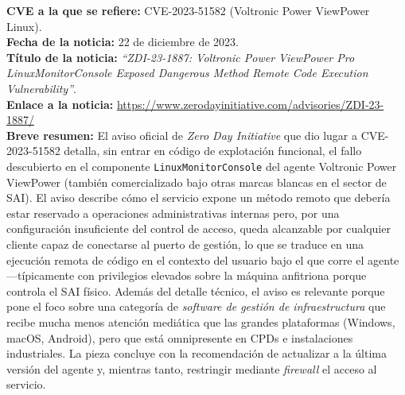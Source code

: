 \begin{tcolorbox}[breakable, colback=lightblue, colframe=darkblue, title=\textbf{Ficha de noticia 3}]
\textbf{CVE a la que se refiere:} CVE-2023-51582 (Voltronic Power ViewPower Linux).\\
\textbf{Fecha de la noticia:} 22 de diciembre de 2023.\\
\textbf{Título de la noticia:} \textit{``ZDI-23-1887: Voltronic Power ViewPower Pro LinuxMonitorConsole Exposed Dangerous Method Remote Code Execution Vulnerability''}.\\
\textbf{Enlace a la noticia:} \url{https://www.zerodayinitiative.com/advisories/ZDI-23-1887/}\\
\textbf{Breve resumen:} El aviso oficial de \textit{Zero Day Initiative} que dio lugar a CVE-2023-51582 detalla, sin entrar en código de explotación funcional, el fallo descubierto en el componente \texttt{LinuxMonitorConsole} del agente Voltronic Power ViewPower (también comercializado bajo otras marcas blancas en el sector de SAI). El aviso describe cómo el servicio expone un método remoto que debería estar reservado a operaciones administrativas internas pero, por una configuración insuficiente del control de acceso, queda alcanzable por cualquier cliente capaz de conectarse al puerto de gestión, lo que se traduce en una ejecución remota de código en el contexto del usuario bajo el que corre el agente ---típicamente con privilegios elevados sobre la máquina anfitriona porque controla el SAI físico. Además del detalle técnico, el aviso es relevante porque pone el foco sobre una categoría de \textit{software de gestión de infraestructura} que recibe mucha menos atención mediática que las grandes plataformas (Windows, macOS, Android), pero que está omnipresente en CPDs e instalaciones industriales. La pieza concluye con la recomendación de actualizar a la última versión del agente y, mientras tanto, restringir mediante \textit{firewall} el acceso al servicio.
\end{tcolorbox}
